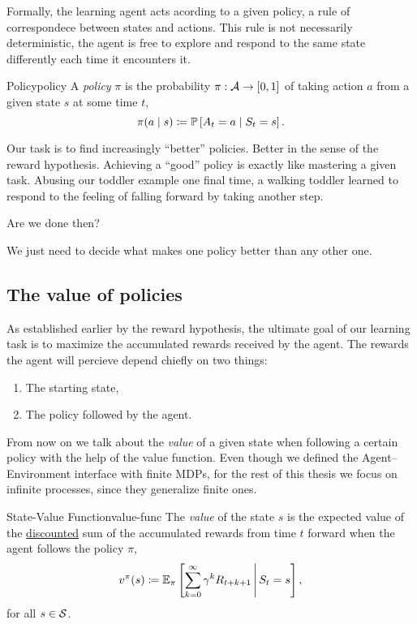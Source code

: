 Formally, the learning agent acts acording to a given policy, a rule of
correspondece between states and actions. This rule is not necessarily
deterministic, the agent is free to explore and respond to the same state
differently each time it encounters it.

\begin{dfn}{Policy}{policy}
	A \emph{policy} $\pi$ is the probability $\pi: \mathcal{A} \to [0,1]$ of taking
	action $a$ from a given state $s$ at some time $t$,
	\begin{equation*}
		\pi(a \mid s) \coloneqq \mathbb{P}\left[A_t = a \mid S_t = s\right].
	\end{equation*}
\end{dfn}

Our task is to find increasingly ``better'' policies. Better in the sense of the
reward hypothesis. Achieving a ``good'' policy is exactly like mastering a given
task. Abusing our toddler example one final time, a walking toddler learned to
respond to the feeling of falling forward by taking another step.

Are we done then? 

We just need to decide what makes one policy better than any other one.

\subsection{The value of policies}
As established earlier by the reward hypothesis, the ultimate goal of our
learning task is to maximize the accumulated rewards received by the agent. The
rewards the agent will percieve depend chiefly on two things:
\begin{enumerate}
	\item The starting state,
	\item The policy followed by the agent.
\end{enumerate}

From now on we talk about the \textit{value} of a given state when following a
certain policy with the help of the value function. Even though we defined the
Agent--Environment interface with finite MDPs, for the rest of this thesis we
focus on infinite processes, since they generalize finite ones.

\begin{dfn}{State-Value Function}{value-func}
	The \emph{value} of the state $s$ is the expected value of the
	\underline{discounted} sum of the accumulated rewards from time $t$ forward
	when the agent follows the policy $\pi$,
	\begin{equation*}
		v^{\pi} (s) \coloneqq \mathbb{E}_{\pi} \left[\sum_{k=0}^{\infty} \gamma^{k} R_{t+k+1} \,\middle\vert\, S_{t} = s\right],
	\end{equation*}
	for all $s \in \mathcal{S}$.
\end{dfn}

